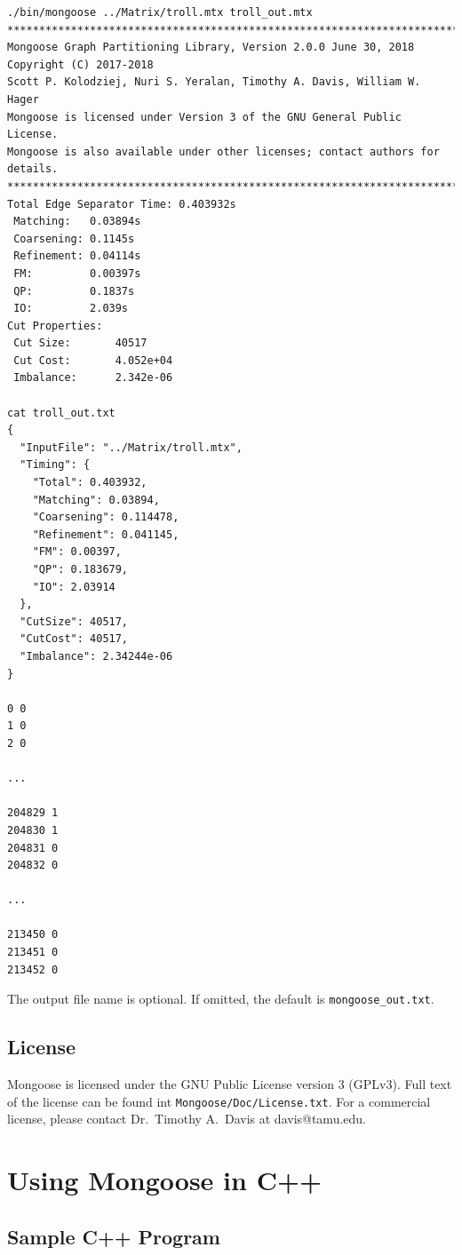 \documentclass[letter]{article}
\begin{document}
\begin{lstlisting}[numbers=none,xleftmargin=.09\textwidth, xrightmargin=.09\textwidth,keywordstyle=\color{black}]
./bin/mongoose ../Matrix/troll.mtx troll_out.mtx
********************************************************************************
Mongoose Graph Partitioning Library, Version 2.0.0 June 30, 2018
Copyright (C) 2017-2018
Scott P. Kolodziej, Nuri S. Yeralan, Timothy A. Davis, William W. Hager
Mongoose is licensed under Version 3 of the GNU General Public License.
Mongoose is also available under other licenses; contact authors for details.
********************************************************************************
Total Edge Separator Time: 0.403932s
 Matching:   0.03894s
 Coarsening: 0.1145s
 Refinement: 0.04114s
 FM:         0.00397s
 QP:         0.1837s
 IO:         2.039s
Cut Properties:
 Cut Size:       40517
 Cut Cost:       4.052e+04
 Imbalance:      2.342e-06

cat troll_out.txt
{
  "InputFile": "../Matrix/troll.mtx",
  "Timing": {
    "Total": 0.403932,
    "Matching": 0.03894,
    "Coarsening": 0.114478,
    "Refinement": 0.041145,
    "FM": 0.00397,
    "QP": 0.183679,
    "IO": 2.03914
  },
  "CutSize": 40517,
  "CutCost": 40517,
  "Imbalance": 2.34244e-06
}

0 0
1 0
2 0

...

204829 1
204830 1
204831 0
204832 0

...

213450 0
213451 0
213452 0
\end{lstlisting}

The output file name is optional. If omitted, the default is \texttt{mongoose\_out.txt}.

\subsection{License}

Mongoose is licensed under the GNU Public License version 3 (GPLv3). Full text of the license can be found int \texttt{Mongoose/Doc/License.txt}. For a commercial license, please contact Dr.~Timothy A.~Davis at davis@tamu.edu.

\section{Using Mongoose in C++}

\subsection{Sample C++ Program}
\end{document}
